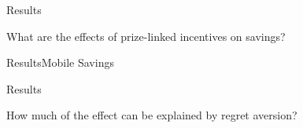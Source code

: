 \documentclass[aspectratio=169]{beamer}
\newenvironment{wideitemize}{\itemize\addtolength{\itemsep}{10pt}}{\enditemize}
\begin{document}
\begin{frame}{Results}
	
	\centering \large What are the effects of prize-linked incentives on savings?

\end{frame}

\begin{frame}{Results}{Mobile Savings}

	


\end{frame}

\begin{frame}{Results}
	
	\centering \large How much of the effect can be explained by regret aversion?

\end{frame}

	

	
\end{document}
